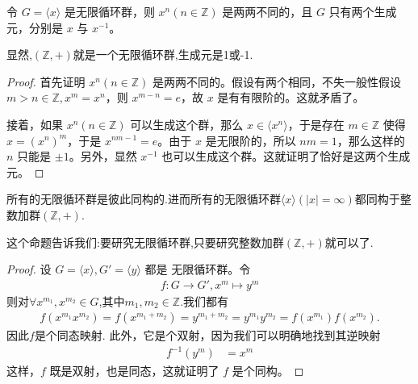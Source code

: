 \documentclass[../../main.tex]{subfiles}
\begin{document}
\begin{proposition}\label{proposition:每一个无限循环群都对应两个生成元}
令 $G = \langle x\rangle$ 是无限循环群，则 $x^n(n\in\mathbb{Z})$ 是两两不同的，且 $G$ 只有两个生成元，分别是 $x$ 与 $x^{-1}$。
\end{proposition}
\begin{note}
显然,$(\mathbb{Z},+)$就是一个无限循环群,生成元是1或-1.
\end{note}
\begin{proof}
首先证明 $x^n(n\in\mathbb{Z})$ 是两两不同的。假设有两个相同，不失一般性假设 $m > n\in\mathbb{Z},x^m = x^n$，则 $x^{m - n}=e$，故 $x$ 是有有限阶的。这就矛盾了。

接着，如果 $x^n(n\in\mathbb{Z})$ 可以生成这个群，那么 $x\in\langle x^n\rangle$，于是存在 $m\in\mathbb{Z}$ 使得 $x=(x^n)^m$，于是 $x^{nm - 1}=e$。由于 $x$ 是无限阶的，所以 $nm = 1$，那么这样的 $n$ 只能是 $\pm1$。另外，显然 $x^{-1}$ 也可以生成这个群。这就证明了恰好是这两个生成元。
\end{proof}

\begin{proposition}\label{proposition:所有的无限循环群是彼此同构的}
所有的无限循环群是彼此同构的.进而所有的无限循环群$\langle x\rangle(|x|=\infty)$都同构于整数加群$(\mathbb{Z},+)$.
\end{proposition}
\begin{note}
这个命题告诉我们:要研究无限循环群,只要研究整数加群$(\mathbb{Z},+)$就可以了.
\end{note}
\begin{proof}
设 $G = \langle x\rangle, G' = \langle y\rangle$ 都是 无限循环群。令
\begin{align*}
f:G\rightarrow G'
,
x^m\mapsto y^m
\end{align*}
则对$\forall x^{m_1},x^{m_2}\in G$,其中$m_1,m_2\in \mathbb{Z}$.我们都有
\begin{align*}
f\left( x^{m_1}x^{m_2} \right) =f\left( x^{m_1+m_2} \right) =y^{m_1+m_2}=y^{m_1}y^{m_2}=f\left( x^{m_1} \right) f\left( x^{m_2} \right) .
\end{align*}
因此$f$是个同态映射.
此外，它是个双射，因为我们可以明确地找到其逆映射
\begin{align*}
f^{-1}(y^m)&=x^m
\end{align*}
这样，$f$ 既是双射，也是同态，这就证明了 $f$ 是个同构。
\end{proof}
\end{document}
